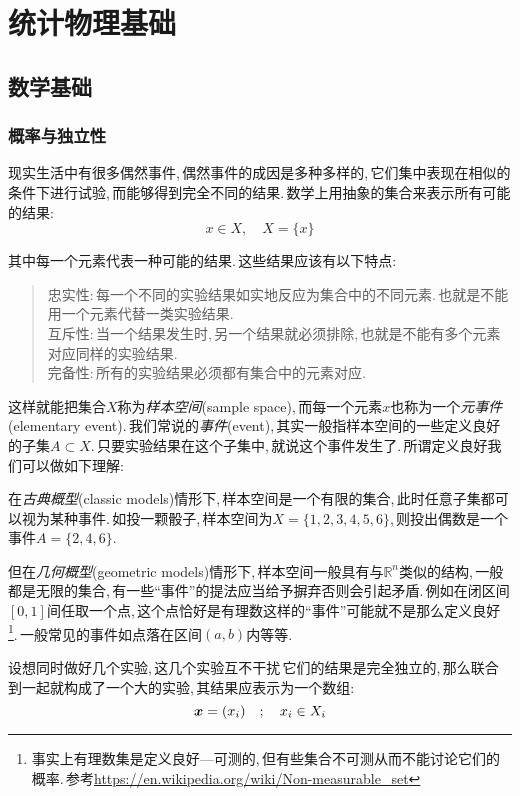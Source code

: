 \chapter{统计物理基础}

\section{数学基础}


\subsection{概率与独立性}
现实生活中有很多偶然事件,\,偶然事件的成因是多种多样的,\,它们集中表现在相似的条件下进行试验,\,而能够得到完全不同的结果.\,数学上用抽象的集合来表示所有可能的结果:
\[x\in X,\quad X=\{x\}\]

其中每一个元素代表一种可能的结果.\,这些结果应该有以下特点:
\begin{quote}
{\hei 忠实性}:\,每一个不同的实验结果如实地反应为集合中的不同元素.\,也就是不能用一个元素代替一类实验结果.\\
{\hei 互斥性}:\,当一个结果发生时,\,另一个结果就必须排除,\,也就是不能有多个元素对应同样的实验结果.\\
{\hei 完备性}:\,所有的实验结果必须都有集合中的元素对应.
\end{quote}

这样就能把集合\(X\)称为\emph{样本空间}(sample space),\,而每一个元素\(x\)也称为一个\emph{元事件}(elementary event).\,我们常说的\emph{事件}(event),\,其实一般指样本空间的一些定义良好的子集\(A\subset X\).\,只要实验结果在这个子集中,\,就说这个事件发生了.\,所谓定义良好我们可以做如下理解:

在\emph{古典概型}(classic models)情形下,\,样本空间是一个有限的集合,\,此时任意子集都可以视为某种事件.\,如投一颗骰子,\,样本空间为\(X=\{1,2,3,4,5,6\}\),\,则投出偶数是一个事件\(A=\{2,4,6\}\).

但在\emph{几何概型}(geometric models)情形下,\,样本空间一般具有与\(\mathbb{R}^n\)类似的结构,\,一般都是无限的集合,\,有一些``事件''的提法应当给予摒弃否则会引起矛盾.\,例如在闭区间\([0,1]\)间任取一个点,\,这个点恰好是有理数这样的``事件''可能就不是那么定义良好\footnote{事实上有理数集是定义良好---可测的,\,但有些集合不可测从而不能讨论它们的概率.\,参考\url{https://en.wikipedia.org/wiki/Non-measurable_set}}.\,一般常见的事件如点落在区间\((a,b)\)内等等.

设想同时做好几个实验,\,这几个实验互不干扰\,它们的结果是完全独立的,\,那么联合到一起就构成了一个大的实验,\,其结果应表示为一个数组:
\[\boldsymbol{x}=(x_i)\quad ;\quad x_i\in X_i\]

